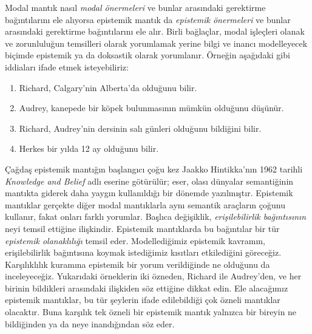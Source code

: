 



Modal mantık nasıl \emph{modal önermeleri} ve bunlar arasındaki gerektirme
bağıntılarını ele alıyorsa epistemik mantık da \emph{epistemik önermeleri} ve
bunlar arasındaki gerektirme bağıntılarını ele alır. Birli bağlaçlar, modal
işleçleri olanak ve zorunluluğun temsilleri olarak yorumlamak yerine bilgi ve
inancı modelleyecek biçimde epistemik ya da doksastik olarak yorumlanır.
Örneğin aşağıdaki gibi iddiaları ifade etmek isteyebiliriz:

\begin{enumerate}
\item Richard, Calgary'nin Alberta'da olduğunu bilir.
\item Audrey, kanepede bir köpek bulunmasının mümkün olduğunu düşünür.
\item Richard, Audrey'nin dersinin salı günleri olduğunu bildiğini bilir.
\item Herkes bir yılda 12 ay olduğunu bilir.
\end{enumerate}
Çağdaş epistemik mantığın başlangıcı çoğu kez Jaakko Hintikka'nın 1962 tarihli
\emph{Knowledge and Belief} adlı eserine götürülür; eser, olası dünyalar
semantiğinin mantıkta giderek daha yaygın kullanıldığı bir dönemde yazılmıştır.
Epistemik mantıklar gerçekte diğer modal mantıklarla aynı semantik araçların
çoğunu kullanır, fakat onları farklı yorumlar. Başlıca değişiklik,
\emph{erişilebilirlik bağıntısının} neyi temsil ettiğine ilişkindir. Epistemik
mantıklarda bu bağıntılar bir tür \emph{epistemik olanaklılığı} temsil eder.
Modellediğimiz epistemik kavramın, erişilebilirlik bağıntısına koymak
istediğimiz kısıtları etkilediğini göreceğiz. Karşılıklılık kuramına epistemik
bir yorum verildiğinde ne olduğunu da inceleyeceğiz. Yukarıdaki örneklerin iki
özneden, Richard ile Audrey'den, ve her birinin bildikleri arasındaki ilişkiden
söz ettiğine dikkat edin. Ele alacağımız epistemik mantıklar, bu tür şeylerin
ifade edilebildiği çok özneli mantıklar olacaktır. Buna karşılık tek özneli bir
epistemik mantık yalnızca bir bireyin ne bildiğinden ya da neye inandığından
söz eder.

